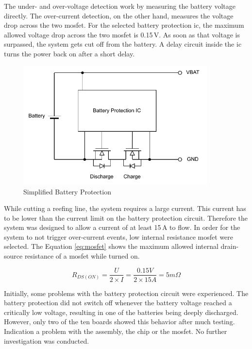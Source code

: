 The under- and over-voltage detection work by measuring the battery voltage directly. The over-current detection, on the other hand, measures the voltage drop across the two \acrshort{mosfet}. For the selected battery protection \acrshort{ic}, the maximum allowed voltage drop across the two \acrshort{mosfet} is 0.15\,V. As soon as that voltage is surpassed, the system gets cut off from the battery. A delay circuit inside the \acrshort{ic} turns the power back on after a short delay. 

\begin{figure}[h!]
	\centering
	\includegraphics[width=10cm]{images/battery-protection}
	\caption{Simplified Battery Protection}
	\label{fig:battery-protection}
\end{figure}

While cutting a reefing line, the system requires a large current. This current has to be lower than the current limit on the battery protection circuit. Therefore the system was designed to allow a current of at least 15\,A to flow. In order for the system to not trigger over-current events, low internal resistance \acrshort{mosfet} were selected. The Equation \ref{eq:mosfet} shows the maximum allowed internal drain-source resistance of a \acrshort{mosfet} while turned on.

\begin{equation}\label{eq:mosfet}
    R_{DS(ON)} = \frac{U}{2 \times I} = \frac{0.15V}{2 \times 15A} = 5m\Omega
\end{equation}

Initially, some problems with the battery protection circuit were experienced. The battery protection did not switch off whenever the battery voltage reached a critically low voltage, resulting in one of the batteries being deeply discharged. However, only two of the ten boards showed this behavior after much testing. Indication a problem with the assembly, the chip or the \acrshort{mosfet}. No further investigation was conducted.


